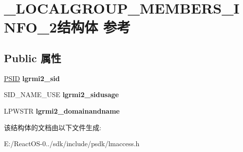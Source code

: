 \hypertarget{struct___l_o_c_a_l_g_r_o_u_p___m_e_m_b_e_r_s___i_n_f_o__2}{}\section{\+\_\+\+L\+O\+C\+A\+L\+G\+R\+O\+U\+P\+\_\+\+M\+E\+M\+B\+E\+R\+S\+\_\+\+I\+N\+F\+O\+\_\+2结构体 参考}
\label{struct___l_o_c_a_l_g_r_o_u_p___m_e_m_b_e_r_s___i_n_f_o__2}
\subsection*{Public 属性}
\begin{DoxyCompactItemize}
\item 
\mbox{\label{struct___l_o_c_a_l_g_r_o_u_p___m_e_m_b_e_r_s___i_n_f_o__2_aba9e9b2b8c2b3b56435e679286ede797}} 
\hyperlink{struct___s_i_d}{P\+S\+ID} {\bfseries lgrmi2\+\_\+sid}
\item 
\mbox{\label{struct___l_o_c_a_l_g_r_o_u_p___m_e_m_b_e_r_s___i_n_f_o__2_a9893b9199699f02e43beb87db74f9a3c}} 
S\+I\+D\+\_\+\+N\+A\+M\+E\+\_\+\+U\+SE {\bfseries lgrmi2\+\_\+sidusage}
\item 
\mbox{\label{struct___l_o_c_a_l_g_r_o_u_p___m_e_m_b_e_r_s___i_n_f_o__2_a341d418729301d03548d935bebb1f900}} 
L\+P\+W\+S\+TR {\bfseries lgrmi2\+\_\+domainandname}
\end{DoxyCompactItemize}


该结构体的文档由以下文件生成\+:\begin{DoxyCompactItemize}
\item 
E\+:/\+React\+O\+S-\/0../sdk/include/psdk/lmaccess.\+h\end{DoxyCompactItemize}
